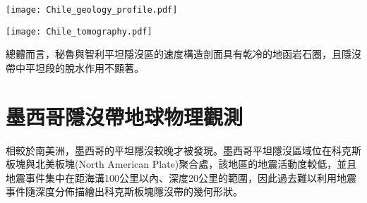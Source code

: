 \begin{figure*}[htp]
    \centering
    \texttt{[image: Chile\_geology\_profile.pdf]}
    \caption[智利中部和阿根廷西部的地質構造與地震活動度背景圖，摘自\citet{Marot2014}]{智利中部和阿根廷西部的地質構造與地震活動度背景圖，摘自\citet{Marot2014}。(a)納茲卡板塊隱沒進入南美板塊的海溝由帶三角形的黑線標出。臨時地震網以倒三角形表示，地震分佈由灰點標出，紅色正三角形為活火山分佈，隱沒板塊等深度線資料來自\citet{anderson2007geometry}。白線為智利與阿根廷的國界，白色圈圈為主要城市，其中黑色星星為智利首都聖地牙哥(Santiago)。灰線與灰透明底為推斷的胡安斐南德斯洋脊隱沒路徑與寬度，插圖為宏觀地圖，兩條黑色虛線為該研究中所觀測的剖面，分別為南緯31.5度(平坦隱沒區)與南緯33.5度(正常隱沒區)。(b)粗黑線標示主要地質縫合帶，帶三角形的黑細線為La Ramada與Aconcagua斷層，白色圈圈為主要城市，紅色正三角形為活火山分佈。(c)(d)為圖(a)中的剖面，黑色點顯示平坦板塊與正常板塊區域的地震活動，倒黑色三角形是海溝位置，紅色三角形是活火山。
    }
    \label{fig::Chile_geology_profile}
\end{figure*}

\begin{figure*}[!ht]
    \centering
    \texttt{[image: Chile\_tomography.pdf]}
    \caption[智利中部和阿根廷西部的熱模型與速度構造剖面，摘自\citet{Marot2014}]{智利中部和阿根廷西部的熱模型與速度構造剖面，摘自\citet{Marot2014}。由上至下為熱構造剖面、V$_P$速度變化、V$_S$速度變化與V$_P$/V$_S$比值，速度構造剖面中的等高線為絕對地震速度。紅點代表該研究地震層析成像所選用的地震事件。白線為莫荷面，灰線為隱沒板塊頂部。(a)為圖\ref{fig::Chile_geology_profile}a中的C剖面。(b)為圖\ref{fig::Chile_geology_profile}a中的D剖面。
    }
    \label{fig::Chile_tomography}
\end{figure*}

總體而言，秘魯與智利平坦隱沒區的速度構造剖面具有乾冷的地函岩石圈，且隱沒帶中平坦段的脫水作用不顯著。
\newpage
\section{墨西哥隱沒帶地球物理觀測}\label{墨西哥隱沒帶地球物理觀測}
相較於南美洲，墨西哥的平坦隱沒較晚才被發現。墨西哥平坦隱沒區域位在科克斯板塊與北美板塊(North American Plate)聚合處，該地區的地震活動度較低，並且地震事件集中在距海溝100公里以內、深度20公里的範圍，因此過去難以利用地震事件隨深度分佈描繪出科克斯板塊隱沒帶的幾何形狀。

